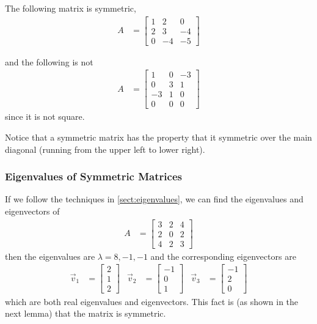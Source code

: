 \begin{example}
The following matrix is symmetric,
%
\begin{align*}
A & = \begin{bmatrix}
1 & 2 & 0 \\
2 & 3 & -4 \\
0 & -4 & -5
\end{bmatrix}
\end{align*}

and the following is not
\begin{align*}
A & = \begin{bmatrix}
1 & 0 & -3 \\
0 & 3 & 1 \\
-3 & 1 & 0 \\
0 & 0 & 0  
\end{bmatrix}
\end{align*}
since it is not square.  
\end{example}

Notice that a symmetric matrix has the property that it symmetric over the main diagonal (running from the upper left to lower right).  

\subsubsection{Eigenvalues of Symmetric Matrices}

If we follow the techniques in \ref{sect:eigenvalues}, we can find the eigenvalues and eigenvectors of 
%
\begin{align*}
A & = \begin{bmatrix}
3 & 2 & 4 \\
2 & 0 & 2 \\
4 & 2 & 3
\end{bmatrix}
\end{align*}
then the eigenvalues are $\lambda=8,-1,-1$ and the corresponding eigenvectors are
\begin{align*}
\vec{v}_1 & = \begin{bmatrix}
2 \\ 1 \\ 2
\end{bmatrix} & \vec{v}_2 & = 
\begin{bmatrix}
-1 \\ 0 \\ 1
\end{bmatrix} & \vec{v}_3 & = 
\begin{bmatrix}
-1 \\ 2 \\ 0 
\end{bmatrix}
\end{align*}
which are both real eigenvalues and eigenvectors.  This fact is (as shown in the next lemma) that the matrix is symmetric.  


